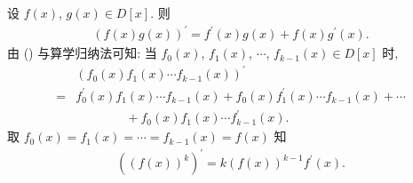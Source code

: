 \begin{proposition}
    设 $f(x)$, $g(x) \in D[x]$. 则
    \begin{align*}
        (f(x) g(x))^{\prime} = f^{\prime} (x) g(x) + f(x) g^{\prime} (x). \tag*{(\myStar)}
    \end{align*}
    由 (\myStar) 与算学归纳法可知: 当 $f_0 (x)$, $f_1 (x)$, $\cdots$, $f_{k-1} (x) \in D[x]$ 时,
    \begin{align*}
             & (f_0 (x) f_1 (x) \cdots f_{k-1} (x))^{\prime}                                                      \\
        = {} & f_0^{\prime} (x) f_1 (x) \cdots f_{k-1} (x) + f_0 (x) f_1^{\prime} (x) \cdots f_{k-1} (x) + \cdots \\
             & \qquad \qquad + f_0 (x) f_1 (x) \cdots f_{k-1}^{\prime} (x).
    \end{align*}
    取 $f_0 (x) = f_1 (x) = \cdots = f_{k-1} (x) = f(x)$ 知
    \begin{align*}
        ((f(x))^k)^{\prime} = k(f(x))^{k-1} f^{\prime} (x).
    \end{align*}
\end{proposition}

